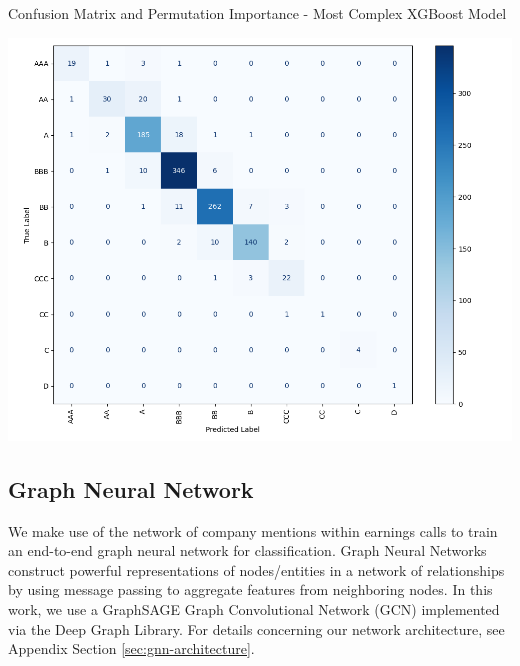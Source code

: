 \documentclass{article}[11pt]
\begin{document}
    \begin{table}[h!]
        \centering
        \caption{Confusion Matrix and Permutation Importance - Most Complex XGBoost Model}
        \begin{minipage}[c]{0.45\linewidth}
            \centering
            \includegraphics[width=0.95\hsize]{../Output/Modelling/XGBoost/exclude_previous_rating_model_3/exclude_previous_rating_model_3_confusion_matrix_no_title.png}
        \end{minipage}
        \begin{minipage}[c]{0.45\linewidth}
            \centering
            
        \end{minipage}
        \label{tab:xgboost-most-complex-confusion-matrix-and-permutation-importance}
    \end{table}

    \subsection*{Graph Neural Network}

    We make use of the network of company mentions within earnings calls to train an end-to-end graph neural network for classification. Graph Neural Networks construct powerful representations of nodes/entities in a network of relationships by using message passing to aggregate features from neighboring nodes. In this work, we use a GraphSAGE \citep{hamilton_inductive_2018} Graph Convolutional Network (GCN) implemented via the Deep Graph Library. For details concerning our network architecture, see Appendix Section \ref{sec:gnn-architecture}.
\end{document}
